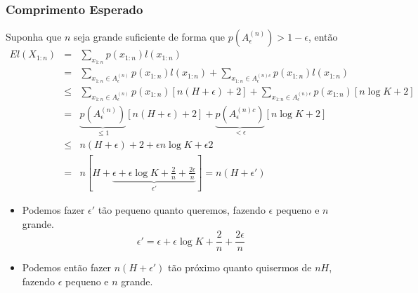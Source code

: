 \begin{frame}[allowframebreaks]
  \frametitle{Comprimento Esperado}
  Suponha que $n$ seja grande suficiente de forma que $p(A_\epsilon^{(n)}) > 1 - \epsilon$, então
  \begin{eqnarray}
  E l(X_{1:n}) &=& \sum_{x_{1:n}} p(x_{1:n}) l(x_{1:n}) \nonumber \\
                &=& \sum_{x_{1:n} \in A_\epsilon^{(n)}} p(x_{1:n}) l(x_{1:n}) + \sum_{x_{1:n} \in A_\epsilon^{(n)c}} p(x_{1:n}) l(x_{1:n}) \nonumber \\
                &\leq& \sum_{x_{1:n} \in A_\epsilon^{(n)}} p(x_{1:n}) [n(H+\epsilon)+2] + \sum_{x_{1:n} \in A_\epsilon^{(n)c}} p(x_{1:n}) [n \log K + 2] \nonumber \\
                &=& \underbrace{p(A_\epsilon^{(n)})}_{\leq 1} [n(H+\epsilon)+2] + \underbrace{p(A_\epsilon^{(n)c})}_{< \epsilon} [n \log K + 2] \nonumber \\
                &\leq& n(H+\epsilon)+2 + \epsilon n \log K + \epsilon 2 \nonumber \\
                &=& n [H + \underbrace{\epsilon + \epsilon \log K + \frac{2}{n} + \frac{2 \epsilon}{n}}_{\epsilon'} ] = n(H+\epsilon')
  \end{eqnarray}

  \framebreak
  \begin{itemize}
  \item Podemos fazer $\epsilon'$ tão pequeno quanto queremos, fazendo $\epsilon$ pequeno e $n$ grande.
        \begin{equation}
        \epsilon' = \epsilon + \epsilon \log K + \frac{2}{n} + \frac{2 \epsilon}{n}
        \end{equation}
  \item Podemos então fazer $n(H+\epsilon')$ tão próximo quanto quisermos de $nH$, fazendo $\epsilon$ pequeno e $n$ grande.
  \end{itemize}
 

\end{frame}
